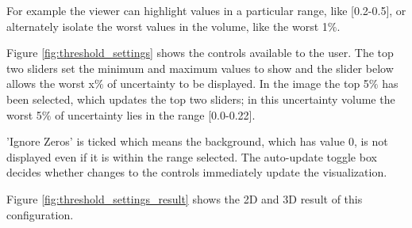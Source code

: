 For example the viewer can highlight values in a particular range, like [0.2-0.5], or alternately isolate the worst values in the volume, like the worst 1$\%$.

Figure \ref{fig:threshold_settings} shows the controls available to the user. The top two sliders set the minimum and maximum values to show and the slider below allows the worst x$\%$ of uncertainty to be displayed. In the image the top 5$\%$ has been selected, which updates the top two sliders; in this uncertainty volume the worst 5$\%$ of uncertainty lies in the range [0.0-0.22].

'Ignore Zeros' is ticked which means the background, which has value 0, is not displayed even if it is within the range selected. The auto-update toggle box decides whether changes to the controls immediately update the visualization.

Figure \ref{fig:threshold_settings_result} shows the 2D and 3D result of this configuration.

